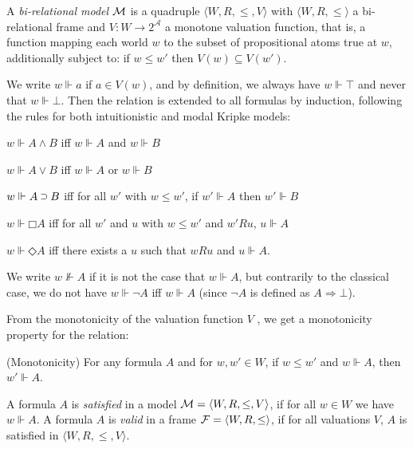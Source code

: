 \documentclass[twoside]{aiml18}
\newcommand*{\AND}{\mathbin{\wedge}}
\newcommand*{\OR}{\mathbin{\vee}}
\newcommand*{\IMP}{\mathbin{\scalebox{.9}{\raise.2ex\hbox{$\supset$}}}}
\newcommand*{\BOX}{\mathord{\Box}}
\newcommand*{\DIA}{\mathord{\Diamond}}
\newcommand{\SEQ}{\Rightarrow}
\begin{document}
\begin{definition}
	\label{model}
	A \emph{bi-relational model} $\mathcal{M}$ is a quadruple $\langle W, R,\le,V \rangle$ with $\langle W, R, \le \rangle$ a bi-relational frame and $V\colon W \to 2^\mathcal{A}$ a monotone valuation function, that is, a function mapping each world $w$ to the subset of propositional atoms true at $w$, additionally subject to:
	if $w \le w'$ then $V(w)\subseteq V(w')$.
\end{definition}

We write $w \Vdash a$ if $a \in V(w)$, and by definition, we always have $w \Vdash \top$ and never that $w \Vdash \bot$. 
%
Then the relation is extended to all formulas by induction, following the rules for both intuitionistic and modal Kripke models:

$w \Vdash A \AND B$ iff $w \Vdash A$ and $w \Vdash B$

$w \Vdash A \OR B$ iff $w \Vdash A$ or $w \Vdash B$

$w \Vdash A \IMP B$ iff for all $w'$ with $w \le w'$, if $w' \Vdash A$ then $w' \Vdash B$

$w \Vdash \BOX A$ iff for all $w'$ and $u$ with $w \le w'$ and $w'Ru$, $u \Vdash A$ \hfill %

$w \Vdash \DIA A$ iff there exists a $u$ such that $wRu$ and $u \Vdash A$.


We write $w \not\Vdash A$ if it is not the case that $w \Vdash A$, but contrarily to the classical case, we do not have $w \Vdash \neg A$ iff $w \Vdash A$ (since $\neg A$ is defined as $A \SEQ \bot$).

From the monotonicity of the valuation function $V$ , we get a monotonicity property for the relation:
\begin{proposition}(Monotonicity) 
For any formula $A$ and for $w, w' \in W$, if $w \le w'$ and $w \Vdash A$, then $w' \Vdash A$.
\end{proposition}



\begin{definition}
	A formula $A$ is \emph{satisfied} in a model $\mathcal{M} = \langle W, R, \le, V \rangle$, if for all $w \in W$ we have $w \Vdash A$.
%
	A formula $A$ is \emph{valid} in a frame $\mathcal{F} = \langle W, R, \le \rangle$, if for all valuations $V$, $A$ is satisfied in $\langle W, R, \le, V \rangle$.
\end{definition}
\end{document}
